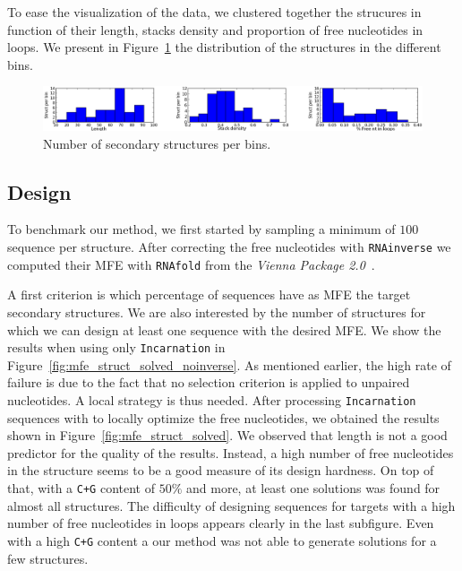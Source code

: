  To ease the visualization of the data, we clustered together the strucures
 in function of their length, stacks density and proportion of free 
 nucleotides in loops. We present in Figure~\ref{fig:bins} the distribution
 of the structures in the different bins.
 
 \begin{figure}[ht!]
 	\centering
	\includegraphics[width=\textwidth]{Figures/bins_distribution.png}
	\caption{Number of secondary structures per bins.}
	\label{fig:bins}
 \end{figure}
 
 
\subsection{Design}
 To benchmark our method, we first started by sampling a minimum
 of $100$ sequence per structure. After correcting the free nucleotides with
 \texttt{RNAinverse} we computed their MFE with \texttt{RNAfold} from the \textit{Vienna Package 2.0}~\cite{Hofacker:1994}.
 
A first criterion is which percentage of sequences have as MFE the target
secondary structures. We are also interested by the number of structures
for which we can design at least one sequence with the desired MFE.
We show the results when using only \texttt{Incarnation} in 
 Figure~\ref{fig:mfe_struct_solved_noinverse}. As mentioned earlier, the high rate of failure
is due to the fact that no selection criterion is applied to
unpaired nucleotides. A local strategy is thus needed.
After processing \texttt{Incarnation} sequences with \RNAinverse to 
locally optimize the free nucleotides, we obtained the results 
shown in Figure~\ref{fig:mfe_struct_solved}. We observed
that length is not a good predictor for the quality of the results. Instead,
a high number of free nucleotides in the structure seems to be a 
good measure of its design hardness. 
On top of that, with a \texttt{C+G} content of $50\%$ and more, at least
one solutions was found for almost all structures. The difficulty of 
designing sequences for targets with a high number of free nucleotides 
 in loops appears clearly in the last subfigure. Even with a high \texttt{C+G} content a our method was not able to generate solutions for a few
 structures. 

